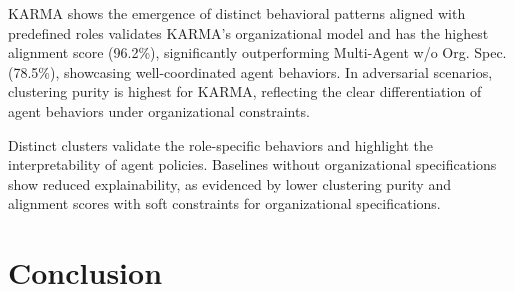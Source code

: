 \documentclass[conference]{IEEEtran}
\begin{document}
KARMA shows the emergence of distinct behavioral patterns aligned with predefined roles validates KARMA's organizational model and has the highest alignment score (96.2\%), significantly outperforming Multi-Agent w/o Org. Spec. (78.5\%), showcasing well-coordinated agent behaviors. In adversarial scenarios, clustering purity is highest for KARMA, reflecting the clear differentiation of agent behaviors under organizational constraints.

Distinct clusters validate the role-specific behaviors and highlight the interpretability of agent policies. Baselines without organizational specifications show reduced explainability, as evidenced by lower clustering purity and alignment scores with soft constraints for organizational specifications.




\section{Conclusion}
\label{sec:conclusion}
\end{document}
